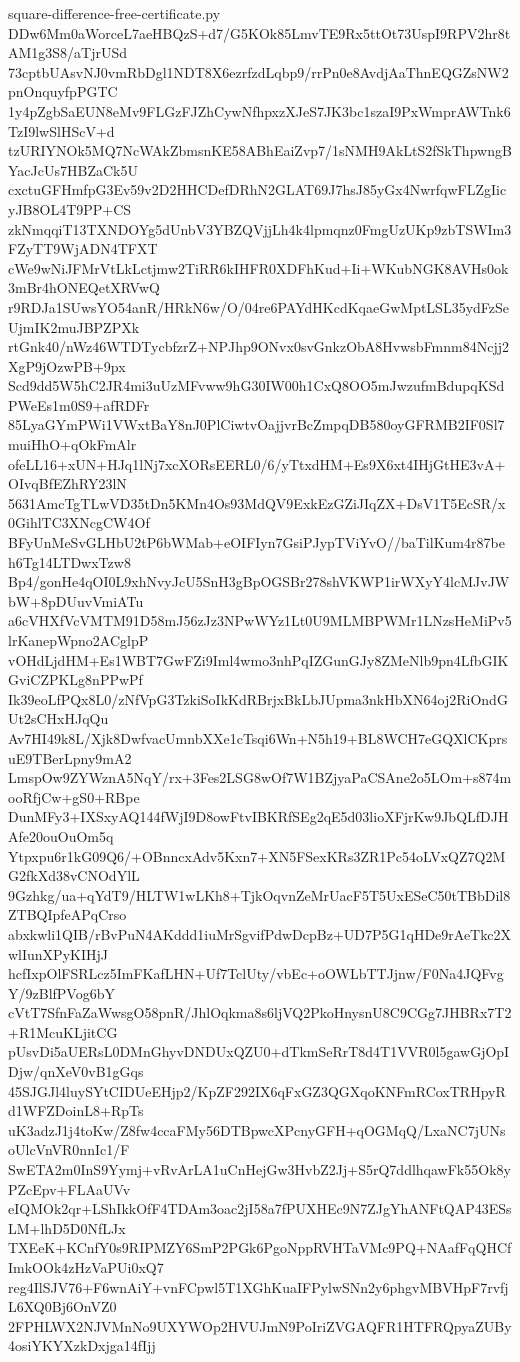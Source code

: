 \documentclass[11pt]{article}
\theoremstyle{definition}
\theoremstyle{remark}
\begin{document}
\begin{filecontents*}[overwrite]{square-difference-free-certificate.py}
DDw6Mm0aWorceL7aeHBQzS+d7/G5KOk85LmvTE9Rx5ttOt73UspI9RPV2hr8tAM1g3S8/aTjrUSd
73cptbUAsvNJ0vmRbDgl1NDT8X6ezrfzdLqbp9/rrPn0e8AvdjAaThnEQGZsNW2pnOnquyfpPGTC
1y4pZgbSaEUN8eMv9FLGzFJZhCywNfhpxzXJeS7JK3bc1szaI9PxWmprAWTnk6TzI9lwSlHScV+d
tzURIYNOk5MQ7NcWAkZbmsnKE58ABhEaiZvp7/1sNMH9AkLtS2fSkThpwngBYacJcUs7HBZaCk5U
cxctuGFHmfpG3Ev59v2D2HHCDefDRhN2GLAT69J7hsJ85yGx4NwrfqwFLZgIicyJB8OL4T9PP+CS
zkNmqqiT13TXNDOYg5dUnbV3YBZQVjjLh4k4lpmqnz0FmgUzUKp9zbTSWIm3FZyTT9WjADN4TFXT
cWe9wNiJFMrVtLkLctjmw2TiRR6kIHFR0XDFhKud+Ii+WKubNGK8AVHs0ok3mBr4hONEQetXRVwQ
r9RDJa1SUwsYO54anR/HRkN6w/O/04re6PAYdHKcdKqaeGwMptLSL35ydFzSeUjmIK2muJBPZPXk
rtGnk40/nWz46WTDTycbfzrZ+NPJhp9ONvx0svGnkzObA8HvwsbFmnm84Ncjj2XgP9jOzwPB+9px
Scd9dd5W5hC2JR4mi3uUzMFvww9hG30IW00h1CxQ8OO5mJwzufmBdupqKSdPWeEs1m0S9+afRDFr
85LyaGYmPWi1VWxtBaY8nJ0PlCiwtvOajjvrBcZmpqDB580oyGFRMB2IF0Sl7muiHhO+qOkFmAlr
ofeLL16+xUN+HJq1lNj7xcXORsEERL0/6/yTtxdHM+Es9X6xt4IHjGtHE3vA+OIvqBfEZhRY23lN
5631AmcTgTLwVD35tDn5KMn4Os93MdQV9ExkEzGZiJIqZX+DsV1T5EcSR/x0GihlTC3XNcgCW4Of
BFyUnMeSvGLHbU2tP6bWMab+eOIFIyn7GsiPJypTViYvO//baTilKum4r87beh6Tg14LTDwxTzw8
Bp4/gonHe4qOI0L9xhNvyJcU5SnH3gBpOGSBr278shVKWP1irWXyY4lcMJvJWbW+8pDUuvVmiATu
a6cVHXfVcVMTM91D58mJ56zJz3NPwWYz1Lt0U9MLMBPWMr1LNzsHeMiPv5lrKanepWpno2ACglpP
vOHdLjdHM+Es1WBT7GwFZi9Iml4wmo3nhPqIZGunGJy8ZMeNlb9pn4LfbGIKGviCZPKLg8nPPwPf
Ik39eoLfPQx8L0/zNfVpG3TzkiSoIkKdRBrjxBkLbJUpma3nkHbXN64oj2RiOndGUt2sCHxHJqQu
Av7HI49k8L/Xjk8DwfvacUmnbXXe1cTsqi6Wn+N5h19+BL8WCH7eGQXlCKprsuE9TBerLpny9mA2
LmspOw9ZYWznA5NqY/rx+3Fes2LSG8wOf7W1BZjyaPaCSAne2o5LOm+s874mooRfjCw+gS0+RBpe
DunMFy3+IXSxyAQ144fWjI9D8owFtvIBKRfSEg2qE5d03lioXFjrKw9JbQLfDJHAfe20ouOuOm5q
Ytpxpu6r1kG09Q6/+OBnncxAdv5Kxn7+XN5FSexKRs3ZR1Pc54oLVxQZ7Q2MG2fkXd38vCNOdYlL
9Gzhkg/ua+qYdT9/HLTW1wLKh8+TjkOqvnZeMrUacF5T5UxESeC50tTBbDil8ZTBQIpfeAPqCrso
abxkwli1QIB/rBvPuN4AKddd1iuMrSgvifPdwDcpBz+UD7P5G1qHDe9rAeTkc2XwlIunXPyKIHjJ
hcfIxpOlFSRLcz5ImFKafLHN+Uf7TclUty/vbEc+oOWLbTTJjnw/F0Na4JQFvgY/9zBlfPVog6bY
cVtT7SfnFaZaWwsgO58pnR/JhlOqkma8s6ljVQ2PkoHnysnU8C9CGg7JHBRx7T2+R1McuKLjitCG
pUsvDi5aUERsL0DMnGhyvDNDUxQZU0+dTkmSeRrT8d4T1VVR0l5gawGjOpIDjw/qnXeV0vB1gGqs
45SJGJl4luySYtCIDUeEHjp2/KpZF292IX6qFxGZ3QGXqoKNFmRCoxTRHpyRd1WFZDoinL8+RpTs
uK3adzJ1j4toKw/Z8fw4ccaFMy56DTBpwcXPcnyGFH+qOGMqQ/LxaNC7jUNsoUlcVnVR0nnIc1/F
SwETA2m0InS9Yymj+vRvArLA1uCnHejGw3HvbZ2Jj+S5rQ7ddlhqawFk55Ok8yPZcEpv+FLAaUVv
eIQMOk2qr+LShIkkOfF4TDAm3oac2jI58a7fPUXHEc9N7ZJgYhANFtQAP43ESsLM+lhD5D0NfLJx
TXEeK+KCnfY0s9RIPMZY6SmP2PGk6PgoNppRVHTaVMc9PQ+NAafFqQHCfImkOOk4zHzVaPUi0xQ7
reg4IlSJV76+F6wnAiY+vnFCpwl5T1XGhKuaIFPylwSNn2y6phgvMBVHpF7rvfjL6XQ0Bj6OnVZ0
2FPHLWX2NJVMnNo9UXYWOp2HVUJmN9PoIriZVGAQFR1HTFRQpyaZUBy4osiYKYXzkDxjga14fIjj

\end{filecontents*}
\end{document}
